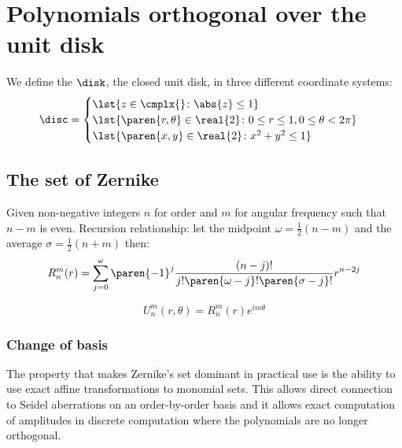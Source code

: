 \documentclass[final,leqno,onefignum,onetabnum]{siamltex1213}
\begin{document}
\clearpage


\Appendix

\section{Polynomials orthogonal over the unit disk}
We define the $\disk$, the closed unit disk, in three different coordinate systems: 
\begin{equation}
  \disc = 
    \begin{cases}
      \lst{z\in\cmplx{} \colon \abs{z} \le 1} \\
      \lst{\paren{ r, \theta }\in\real{2} \colon 0\le r \le 1, 0 \le \theta < 2\pi} \\
      \lst{\paren{ x, y }\in\real{2} \colon x^{2} + y^{2} \le 1}
    \end{cases}
    \label{eq:unit disk}
\end{equation}

\subsection{The set of Zernike}
Given non-negative integers $n$ for order and $m$ for angular frequency such that $n-m$ is even.
Recursion relationship: let the midpoint $\omega=\frac{1}{2}(n-m)$ and the average $\sigma=\frac{1}{2}(n+m)$ then: 
\begin{equation}
  R_n^m(r) = \sum_{j=0}^{\omega}{\paren{-1}^j\frac{(n-j)!}{j!\paren{\omega-j}!\paren{\sigma-j}!}r^{n-2j}}
  \label{eq:recursion}
\end{equation}

  \begin{equation}
    U_n^m(r,\theta) = R_n^{m}(r)e^{i m \theta}
  \end{equation}
  
\subsubsection{Change of basis}
The property that makes Zernike's set dominant in practical use is the ability to use exact affine transformations to monomial sets. This allows direct connection to Seidel aberrations on an order-by-order basis and it allows exact computation of amplitudes in discrete computation where the polynomials are no longer orthogonal.
\end{document}

